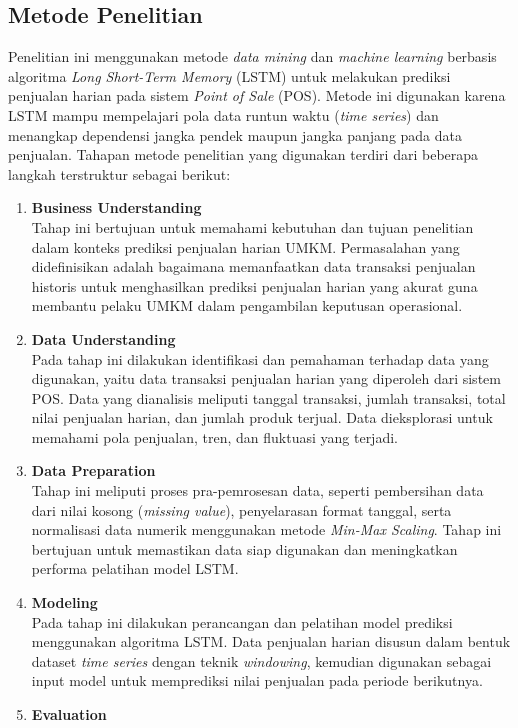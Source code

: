 \subsection{Metode Penelitian}
Penelitian ini menggunakan metode \textit{data mining} dan \textit{machine learning} berbasis algoritma \textit{Long Short-Term Memory} (LSTM) untuk melakukan prediksi penjualan harian pada sistem \textit{Point of Sale} (POS). Metode ini digunakan karena LSTM mampu mempelajari pola data runtun waktu (\textit{time series}) dan menangkap dependensi jangka pendek maupun jangka panjang pada data penjualan. Tahapan metode penelitian yang digunakan terdiri dari beberapa langkah terstruktur sebagai berikut:
\begin{enumerate}
    \item \textbf{Business Understanding} \\
    Tahap ini bertujuan untuk memahami kebutuhan dan tujuan penelitian dalam konteks prediksi penjualan harian UMKM. Permasalahan yang didefinisikan adalah bagaimana memanfaatkan data transaksi penjualan historis untuk menghasilkan prediksi penjualan harian yang akurat guna membantu pelaku UMKM dalam pengambilan keputusan operasional.
    \item \textbf{Data Understanding} \\
    Pada tahap ini dilakukan identifikasi dan pemahaman terhadap data yang digunakan, yaitu data transaksi penjualan harian yang diperoleh dari sistem POS. Data yang dianalisis meliputi tanggal transaksi, jumlah transaksi, total nilai penjualan harian, dan jumlah produk terjual. Data dieksplorasi untuk memahami pola penjualan, tren, dan fluktuasi yang terjadi.
    \item \textbf{Data Preparation} \\
    Tahap ini meliputi proses pra-pemrosesan data, seperti pembersihan data dari nilai kosong (\textit{missing value}), penyelarasan format tanggal, serta normalisasi data numerik menggunakan metode \textit{Min-Max Scaling}. Tahap ini bertujuan untuk memastikan data siap digunakan dan meningkatkan performa pelatihan model LSTM.
    \item \textbf{Modeling} \\
    Pada tahap ini dilakukan perancangan dan pelatihan model prediksi menggunakan algoritma LSTM. Data penjualan harian disusun dalam bentuk dataset \textit{time series} dengan teknik \textit{windowing}, kemudian digunakan sebagai input model untuk memprediksi nilai penjualan pada periode berikutnya.
    \item \textbf{Evaluation} \\

\end{enumerate}
